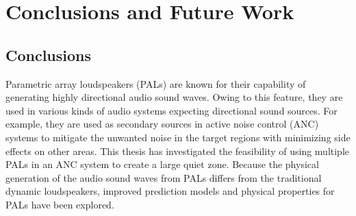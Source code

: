 \chapter{Conclusions and Future Work} %
\label{chap:conclusion} %

\section{Conclusions}
{
Parametric array loudspeakers (PALs) are known for their capability of generating highly
directional audio sound waves. Owing to this feature, they are used in various kinds of audio systems expecting directional sound sources.
For example, they are used as secondary sources in active noise control (ANC) systems to mitigate the unwanted noise in the target regions with minimizing side effects on other areas.
This thesis has investigated the feasibility of using multiple PALs in an ANC system to create a large quiet zone.
Because the physical generation of the audio sound waves from PALs differs from the traditional dynamic loudspeakers,
improved prediction models and physical properties for PALs have been explored.
}



